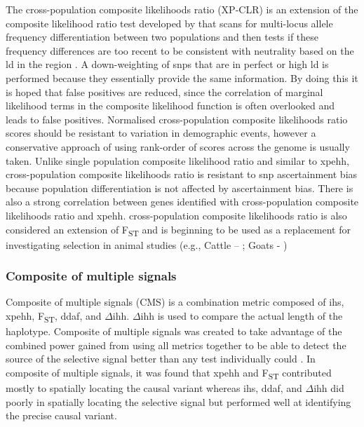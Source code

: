 \documentclass[twoside,openright]{report}
\begin{document}
The cross-population composite likelihoods ratio (XP-CLR) is an
extension of the composite likelihood ratio test developed by
\citet{Nielsen2009} that scans for multi-locus allele frequency
differentiation between two populations and then tests if these
frequency differences are too recent to be consistent with neutrality
based on the \gls{ld} in the region \citep{Chen2010}. A down-weighting
of \glspl{snp} that are in perfect or high \gls{ld} is performed because
they essentially provide the same information. By doing this it is hoped
that false positives are reduced, since the correlation of marginal
likelihood terms in the composite likelihood function is often
overlooked and leads to false positives. Normalised cross-population
composite likelihoods ratio scores should be resistant to variation in
demographic events, however a conservative approach of using rank-order
of scores across the genome is usually taken. Unlike single population
composite likelihood ratio and similar to \gls{xpehh}, cross-population
composite likelihoods ratio is resistant to \gls{snp} ascertainment bias
because population differentiation is not affected by ascertainment
bias. There is also a strong correlation between genes identified with
cross-population composite likelihoods ratio and \gls{xpehh}.
cross-population composite likelihoods ratio is also considered an
extension of F\textsubscript{ST} and is beginning to be used as a
replacement for investigating selection in animal studies (e.g., Cattle
-- \citet{Lee2014}; Goats - \citet{Benjelloun2015})

\subsubsection{Composite of multiple
signals}\label{composite-of-multiple-signals}

Composite of multiple signals (CMS) is a combination metric composed of
\gls{ihs}, \gls{xpehh}, F\textsubscript{ST}, \gls{ddaf}, and
\(\Delta\)\gls{ihh}. \(\Delta\)\gls{ihh} is used to compare the actual
length of the haplotype. Composite of multiple signals was created to
take advantage of the combined power gained from using all metrics
together to be able to detect the source of the selective signal better
than any test individually could \citep{Grossman2010}. In composite of
multiple signals, it was found that \gls{xpehh} and F\textsubscript{ST}
contributed mostly to spatially locating the causal variant whereas
\gls{ihs}, \gls{ddaf}, and \(\Delta\)\gls{ihh} did poorly in spatially
locating the selective signal but performed well at identifying the
precise causal variant.
\end{document}
